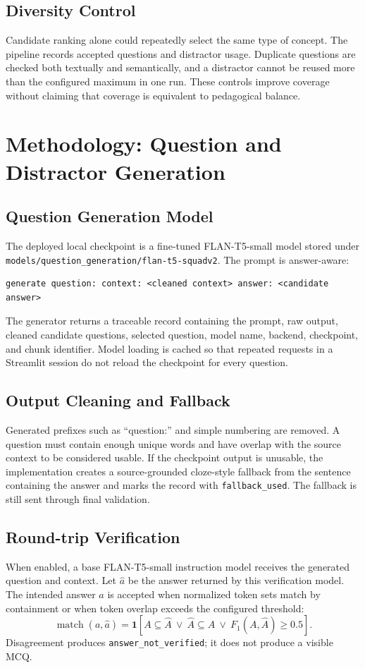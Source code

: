\documentclass[12pt,a4paper]{report}
\newcommand{\code}[1]{\texttt{#1}}
\begin{document}
\section{Diversity Control}
Candidate ranking alone could repeatedly select the same type of concept. The pipeline records accepted questions and distractor usage. Duplicate questions are checked both textually and semantically, and a distractor cannot be reused more than the configured maximum in one run. These controls improve coverage without claiming that coverage is equivalent to pedagogical balance.

\clearpage
\chapter{Methodology: Question and Distractor Generation}
\section{Question Generation Model}
The deployed local checkpoint is a fine-tuned FLAN-T5-small model stored under \code{models/question\_generation/flan-t5-squadv2}. The prompt is answer-aware:
\begin{lstlisting}
generate question: context: <cleaned context> answer: <candidate answer>
\end{lstlisting}
The generator returns a traceable record containing the prompt, raw output, cleaned candidate questions, selected question, model name, backend, checkpoint, and chunk identifier. Model loading is cached so that repeated requests in a Streamlit session do not reload the checkpoint for every question.

\section{Output Cleaning and Fallback}
Generated prefixes such as ``question:'' and simple numbering are removed. A question must contain enough unique words and have overlap with the source context to be considered usable. If the checkpoint output is unusable, the implementation creates a source-grounded cloze-style fallback from the sentence containing the answer and marks the record with \code{fallback\_used}. The fallback is still sent through final validation.

\section{Round-trip Verification}
When enabled, a base FLAN-T5-small instruction model receives the generated question and context. Let $\hat{a}$ be the answer returned by this verification model. The intended answer $a$ is accepted when normalized token sets match by containment or when token overlap exceeds the configured threshold:
\[
\operatorname{match}(a,\hat{a}) = \mathbf{1}[A\subseteq\hat{A}\ \lor\ \hat{A}\subseteq A\ \lor\ F_1(A,\hat{A})\geq 0.5].
\]
Disagreement produces \code{answer\_not\_verified}; it does not produce a visible MCQ.
\end{document}
